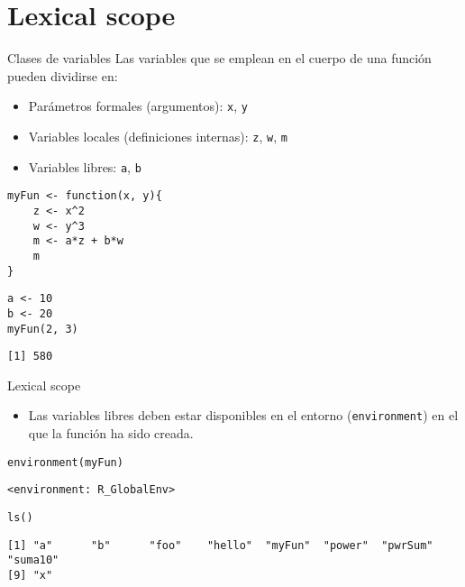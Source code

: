 \documentclass[xcolor={usenames,svgnames,dvipsnames}]{beamer}
\begin{document}
\section{Lexical scope}
\label{sec:org4dbb409}

\begin{frame}[fragile,label={sec:org78093aa}]{Clases de variables}
 Las variables que se emplean en el cuerpo de una función pueden
dividirse en:
\begin{itemize}
\item Parámetros formales (argumentos): \texttt{x}, \texttt{y}
\item Variables locales (definiciones internas): \texttt{z}, \texttt{w}, \texttt{m}
\item Variables libres: \texttt{a}, \texttt{b}
\end{itemize}
\lstset{language=r,label= ,caption= ,captionpos=b,numbers=none}
\begin{lstlisting}
myFun <- function(x, y){
    z <- x^2
    w <- y^3
    m <- a*z + b*w
    m
}
\end{lstlisting}

\lstset{language=r,label= ,caption= ,captionpos=b,numbers=none}
\begin{lstlisting}
a <- 10
b <- 20
myFun(2, 3)
\end{lstlisting}

\begin{verbatim}
[1] 580
\end{verbatim}
\end{frame}

\begin{frame}[fragile,label={sec:org8efb5c1}]{Lexical scope}
 \begin{itemize}
\item Las variables libres deben estar disponibles en el entorno
(\texttt{environment}) en el que la función ha sido creada.
\end{itemize}
\lstset{language=r,label= ,caption= ,captionpos=b,numbers=none}
\begin{lstlisting}
environment(myFun)
\end{lstlisting}

\begin{verbatim}
<environment: R_GlobalEnv>
\end{verbatim}

\lstset{language=r,label= ,caption= ,captionpos=b,numbers=none}
\begin{lstlisting}
ls()
\end{lstlisting}

\begin{verbatim}
[1] "a"      "b"      "foo"    "hello"  "myFun"  "power"  "pwrSum" "suma10"
[9] "x"
\end{verbatim}
\end{frame}
\end{document}

